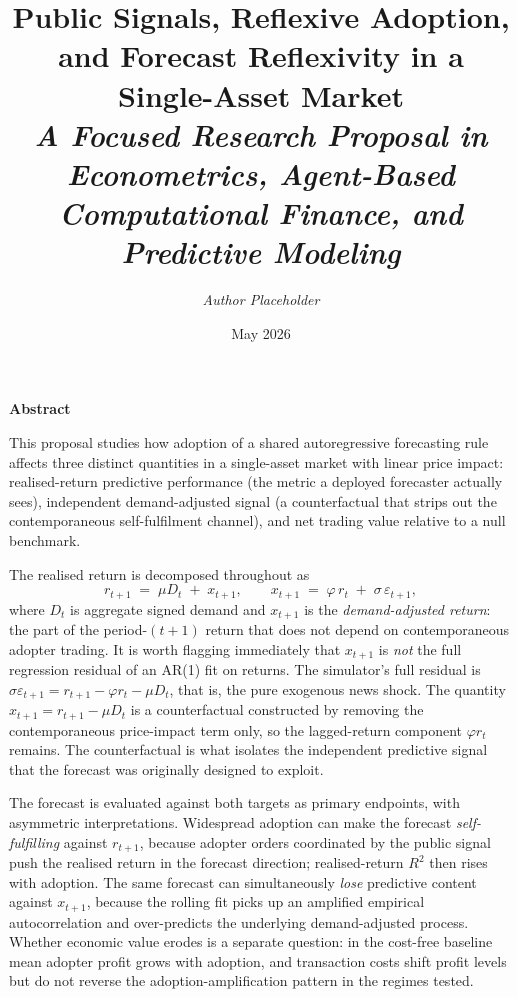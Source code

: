 \documentclass[11pt]{article}
\title{
  {\LARGE\bfseries Public Signals, Reflexive Adoption,\\ and Forecast Reflexivity in a Single-Asset Market}\\[0.8em]
  {\large\itshape A Focused Research Proposal in Econometrics, Agent-Based\\ Computational Finance, and Predictive Modeling}
}
\author{\textit{Author Placeholder}}
\date{May 2026}
\begin{document}
\maketitle

\vspace{0.25em}
\begin{center}
{\Large\bfseries\color{accent} Abstract}
\end{center}
\vspace{0.15em}

This proposal studies how adoption of a shared autoregressive forecasting rule affects three distinct quantities in a single-asset market with linear price impact: realised-return predictive performance (the metric a deployed forecaster actually sees), independent demand-adjusted signal (a counterfactual that strips out the contemporaneous self-fulfilment channel), and net trading value relative to a null benchmark.

The realised return is decomposed throughout as
\begin{equation*}
  r_{t+1} \;=\; \mu D_t \;+\; x_{t+1}, \qquad x_{t+1} \;=\; \varphi\, r_t \;+\; \sigma\, \varepsilon_{t+1},
\end{equation*}
where $D_t$ is aggregate signed demand and $x_{t+1}$ is the \emph{demand-adjusted return}: the part of the period-$(t+1)$ return that does not depend on contemporaneous adopter trading. It is worth flagging immediately that $x_{t+1}$ is \emph{not} the full regression residual of an AR(1) fit on returns. The simulator's full residual is $\sigma \varepsilon_{t+1} = r_{t+1} - \varphi r_t - \mu D_t$, that is, the pure exogenous news shock. The quantity $x_{t+1} = r_{t+1} - \mu D_t$ is a counterfactual constructed by removing the contemporaneous price-impact term only, so the lagged-return component $\varphi r_t$ remains. The counterfactual is what isolates the independent predictive signal that the forecast was originally designed to exploit.

The forecast is evaluated against both targets as primary endpoints, with asymmetric interpretations. Widespread adoption can make the forecast \emph{self-fulfilling} against $r_{t+1}$, because adopter orders coordinated by the public signal push the realised return in the forecast direction; realised-return $R^{2}$ then rises with adoption. The same forecast can simultaneously \emph{lose} predictive content against $x_{t+1}$, because the rolling fit picks up an amplified empirical autocorrelation and over-predicts the underlying demand-adjusted process. Whether economic value erodes is a separate question: in the cost-free baseline mean adopter profit grows with adoption, and transaction costs shift profit levels but do not reverse the adoption-amplification pattern in the regimes tested.
\end{document}
